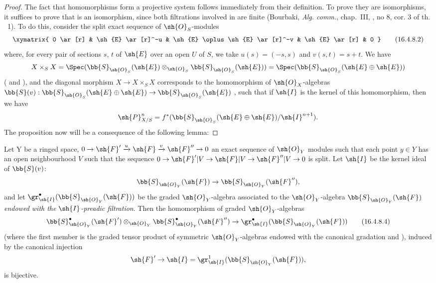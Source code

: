 \begin{proof}
The fact that homomorphisms  form a projective system follows immediately from their definition.
To prove they are isomorphisms, it suffices to 
prove that  is an isomorphism, since both filtrations involved in  are finite (Bourbaki, \emph{Alg. comm.}, chap.~III, , no 8, cor. 3 of th. ~1).
To do this, consider the split exact sequence of $\sh{O}_S$-modules
\[
  \label{IV.16.4.8.2}
  \xymatrix{
    0 \ar[r] & \sh{E} \ar[r]^-u & \sh{E} \oplus \sh{E} \ar[r]^-v & \sh{E} \ar[r] & 0
  }
  \tag{16.4.8.2}
\] 
where, for every pair of sections $s$, $t$ of $\sh{E}$ over an open $U$ of $S$, we take $u(s) = (-s, s)$ and $v(s,t) = s + t$.
We have
\[
  X \times_S X = \Spec(\bb{S}_{\sh{O}_S}(\sh{E}) \otimes_{\sh{O}_S} \bb{S}_{\sh{O}_S}(\sh{E})) = \Spec(\bb{S}_{\sh{O}_S}(\sh{E} \oplus \sh{E}))
\]
( and ), and the diagonal morphism $X \to X \times_S X$ corresponds  to the homomorphism of $\sh{O}_X$-algebras $\bb{S}(v): \bb{S}_{\sh{O}_S}(\sh{E} \oplus \sh{E}) \to \bb{S}_{\sh{O}_S}(\sh{E})$ , such that if $\sh{I}$ is the kernel of this homomorphism, then we have
\[
  \sh{P}_{X/S}^n = f^*(\bb{S}_{\sh{O}_S}(\sh{E} \oplus \sh{E})/\sh{I}^{n+1}).
\]
The proposition now will be a consequence of the following lemma:
\end{proof}

\begin{lemma}[16.4.8.3]
\label{IV.16.4.8.3}
Let Y be a ringed space, $0 \to \sh{F}'  \xrightarrow{u} \sh{F} \xrightarrow{v} \sh{F}'' \to 0$ an exact sequence of $\sh{O}_Y$ modules such that each point $y \in Y$ has an open neighbourhood $V$ such that the sequence $0 \to \sh{F}'|V \to \sh{F}|V \to \sh{F}''|V \to 0$ is split.
Let $\sh{I}$ be the kernel ideal of $\bb{S}(v)$:
\[
  \bb{S}_{\sh{O}_Y}(\sh{F}) \to \bb{S}_{\sh{O}_Y}(\sh{F}''),
\]
and let $\gr_{\sh{I}}^\bullet(\bb{S}_{\sh{O}_Y}(\sh{F}))$ be the graded $\sh{O}_Y$-algebra associated to the $\sh{O}_Y$-algebra $\bb{S}_{\sh{O}_Y}(\sh{F})$ \emph{endowed with the $\sh{I}$-preadic filtration}.
Then the homomorphism of graded $\sh{O}_Y$-algebras
\[
  \label{IV.16.4.8.4}
  \bb{S}_{\sh{O}_Y}^\bullet(\sh{F}') \otimes_{\sh{O}_Y} \bb{S}_{\sh{O}_Y}^\bullet(\sh{F}'') \to \gr_{\sh{I}}^\bullet(\bb{S}_{\sh{O}_Y}(\sh{F}))
  \tag{16.4.8.4}
\]
(where the first member is the graded tensor product of symmetric $\sh{O}_Y$-algebras endowed with the canonical gradation  and ), induced by the canonical injection
\[
  \sh{F}' \to \sh{I} = \gr_{\sh{I}}^1(\bb{S}_{\sh{O}_Y}(\sh{F})),
\]
is bijective.
\end{lemma}

